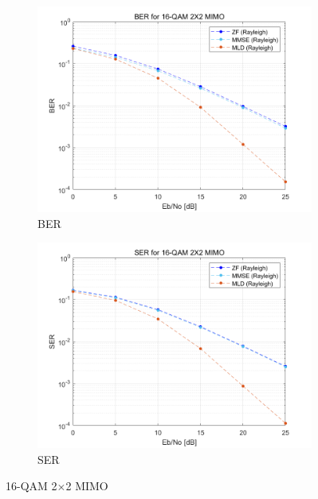 \documentclass{article}
\begin{document}
\begin{figure}[H]
\begin{subfigure}{0.5\textwidth}
		\centerline{\includegraphics[width=1\textwidth]{b_Eb_BER.png}}
		\caption{BER}
	\end{subfigure}%
	\begin{subfigure}{0.5\textwidth}
		\centerline{\includegraphics[width=1\textwidth]{b_Eb_SER.png}}
		\caption{SER}
	\end{subfigure}%
	\caption{16-QAM 2$\times$2 MIMO}
\end{figure}
\end{document}
